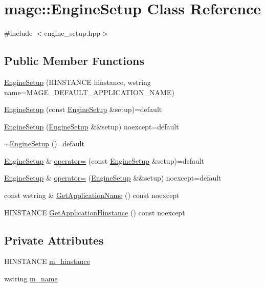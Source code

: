 \hypertarget{classmage_1_1_engine_setup}{}\section{mage\+:\+:Engine\+Setup Class Reference}
\label{classmage_1_1_engine_setup}


{\ttfamily \#include $<$engine\+\_\+setup.\+hpp$>$}

\subsection*{Public Member Functions}
\begin{DoxyCompactItemize}
\item 
\hyperlink{classmage_1_1_engine_setup_ac3ed7aa532ce0547a1a351c2d5399866}{Engine\+Setup} (H\+I\+N\+S\+T\+A\+N\+CE hinstance, wstring name=M\+A\+G\+E\+\_\+\+D\+E\+F\+A\+U\+L\+T\+\_\+\+A\+P\+P\+L\+I\+C\+A\+T\+I\+O\+N\+\_\+\+N\+A\+ME)
\item 
\hyperlink{classmage_1_1_engine_setup_a40980f5fce1554c2a93707efdf4486a9}{Engine\+Setup} (const \hyperlink{classmage_1_1_engine_setup}{Engine\+Setup} \&setup)=default
\item 
\hyperlink{classmage_1_1_engine_setup_a22b87954ad7a2bc26ff7f26fb443c58c}{Engine\+Setup} (\hyperlink{classmage_1_1_engine_setup}{Engine\+Setup} \&\&setup) noexcept=default
\item 
\hyperlink{classmage_1_1_engine_setup_a0480bee101756b72233a1aa7d44eb185}{$\sim$\+Engine\+Setup} ()=default
\item 
\hyperlink{classmage_1_1_engine_setup}{Engine\+Setup} \& \hyperlink{classmage_1_1_engine_setup_a4234ca6df84db6a2005b994ed42da11f}{operator=} (const \hyperlink{classmage_1_1_engine_setup}{Engine\+Setup} \&setup)=default
\item 
\hyperlink{classmage_1_1_engine_setup}{Engine\+Setup} \& \hyperlink{classmage_1_1_engine_setup_a4c2e71f96f138b28fd6ff1c088d05a53}{operator=} (\hyperlink{classmage_1_1_engine_setup}{Engine\+Setup} \&\&setup) noexcept=default
\item 
const wstring \& \hyperlink{classmage_1_1_engine_setup_ab79015dba68069256ed42595b30a5728}{Get\+Application\+Name} () const noexcept
\item 
H\+I\+N\+S\+T\+A\+N\+CE \hyperlink{classmage_1_1_engine_setup_a2d6377386d47058252d77d168d5e60ec}{Get\+Application\+Hinstance} () const noexcept
\end{DoxyCompactItemize}
\subsection*{Private Attributes}
\begin{DoxyCompactItemize}
\item 
H\+I\+N\+S\+T\+A\+N\+CE \hyperlink{classmage_1_1_engine_setup_af91461305cd9aa60e22fa770395d2238}{m\+\_\+hinstance}
\item 
wstring \hyperlink{classmage_1_1_engine_setup_a3866920e44c0752a89265f9f0c5c5d05}{m\+\_\+name}
\end{DoxyCompactItemize}


